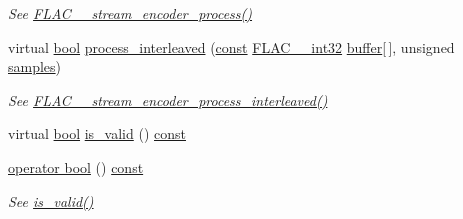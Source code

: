 \begin{DoxyCompactItemize}
\begin{DoxyCompactList}\small\item\em See \hyperlink{group__flac__stream__encoder_gae187ec4f6cab3ca109637996ee23272d}{F\+L\+A\+C\+\_\+\+\_\+stream\+\_\+encoder\+\_\+process()} \end{DoxyCompactList}\item 
virtual \hyperlink{mac_2config_2i386_2lib-src_2libsoxr_2soxr-config_8h_abb452686968e48b67397da5f97445f5b}{bool} \hyperlink{class_f_l_a_c_1_1_encoder_1_1_stream_aac4cb649f8a41c7a310d610af2f5445b}{process\+\_\+interleaved} (\hyperlink{getopt1_8c_a2c212835823e3c54a8ab6d95c652660e}{const} \hyperlink{ordinals_8h_a33fd77bfe6d685541a0c034a75deccdc}{F\+L\+A\+C\+\_\+\+\_\+int32} \hyperlink{structbuffer}{buffer}\mbox{[}$\,$\mbox{]}, unsigned \hyperlink{test__w__saw8_8c_a54185623a5a093f671a73e5fba6197a1}{samples})
\begin{DoxyCompactList}\small\item\em See \hyperlink{group__flac__stream__encoder_ga67c2ff5b23b945180797de420b1f27c0}{F\+L\+A\+C\+\_\+\+\_\+stream\+\_\+encoder\+\_\+process\+\_\+interleaved()} \end{DoxyCompactList}\end{DoxyCompactItemize}
{\bf }\par
\begin{DoxyCompactItemize}
\item 
virtual \hyperlink{mac_2config_2i386_2lib-src_2libsoxr_2soxr-config_8h_abb452686968e48b67397da5f97445f5b}{bool} \hyperlink{class_f_l_a_c_1_1_encoder_1_1_stream_abb12dc332530d995a8a929a5b51ffc8b}{is\+\_\+valid} () \hyperlink{getopt1_8c_a2c212835823e3c54a8ab6d95c652660e}{const} 
\item 
\hyperlink{class_f_l_a_c_1_1_encoder_1_1_stream_a9cc2181c5be961e2b6ad1945bf57e37b}{operator bool} () \hyperlink{getopt1_8c_a2c212835823e3c54a8ab6d95c652660e}{const} 
\begin{DoxyCompactList}\small\item\em See \hyperlink{class_f_l_a_c_1_1_encoder_1_1_stream_abb12dc332530d995a8a929a5b51ffc8b}{is\+\_\+valid()} \end{DoxyCompactList}\end{DoxyCompactItemize}

